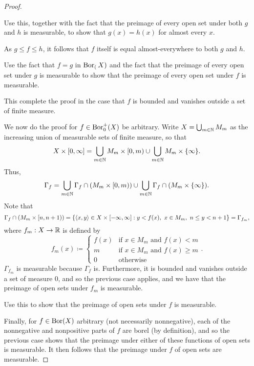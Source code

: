 \begin{prp}
\begin{proof}
\begin{exr}
Use this, together with the fact that the preimage of every open set under both $g$ and $h$ is measurable, to show that $g(x)=h(x)$ for almost every $x$.
\end{exr}
As $g\leq f\leq h$, it follows that $f$ itself is equal almost-everywhere to both $g$ and $h$.
\begin{exr}
Use the fact that $f=g$ in $\operatorname{Bor} _(X)$ and the fact that the preimage of every open set under $g$ is measurable to show that the preimage of every open set under $f$ is measurable.
\end{exr}
This complete the proof in the case that $f$ is bounded and vanishes outside a set of finite measure.

We now do the proof for $f\in \operatorname{Bor} _0^+(X)$ be arbitrary.  Write $X=\bigcup _{m\in \mathbb{N}}M_m$ as the increasing union of measurable sets of finite measure, so that
\begin{equation}
X\times [0,\infty ]=\bigcup _{m\in \mathbb{N}}M_m\times [0,m)\cup \bigcup _{m\in \mathbb{N}}M_m\times \{ \infty \} .
\end{equation}
Thus,
\begin{equation}
\Gamma _f=\bigcup _{m\in \mathbb{N}}\Gamma _f\cap (M_m\times [0,m))\cup \bigcup _{m\in \mathbb{N}}\Gamma _f\cap (M_m\times \{ \infty \} ).
\end{equation}
Note that
\begin{equation}
\Gamma _f\cap (M_m\times [n,n+1))=\left\{ \langle x,y\rangle\in X\times [-\infty ,\infty ]:y<f(x),\ x\in M_m ,\ n\leq y<n+1\right\} =\Gamma _{f_m},
\end{equation}
where $f_m:X\rightarrow \mathbb{R}$ is defined by
\begin{equation}
f_m(x)\coloneqq \begin{cases}f(x) & \text{if }x\in M_m\text{ and }f(x)<m \\ m & \text{if }x\in M_m\text{ and }f(x)\geq m \\ 0 & \text{otherwise}\end{cases}.
\end{equation}
$\Gamma _{f_m}$ is measurable because $\Gamma _f$ is.  Furthermore, it is bounded and vanishes outside a set of measure $0$, and so the previous case applies, and we have that the preimage of open sets under $f_m$ is measurable.
\begin{exr}
Use this to show that the preimage of open sets under $f$ is measurable.
\end{exr}

Finally, for $f\in \operatorname{Bor} (X)$ arbitrary (not necessarily nonnegative), each of the nonnegative and nonpositive parts of $f$ are borel (by definition), and so the previous case shows that the preimage under either of these functions of open sets is measurable.  It then follows that the preimage under $f$ of open sets are measurable.


\end{proof}
\end{prp}
